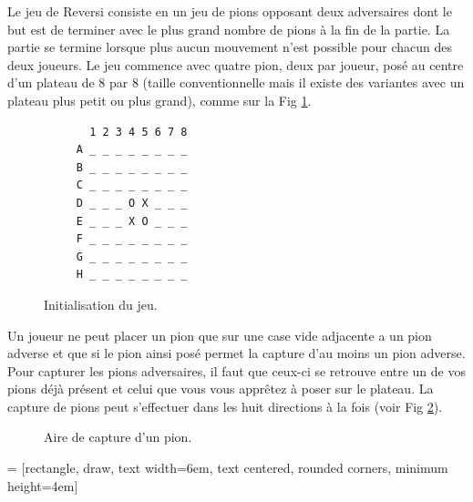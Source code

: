 \documentclass[10pt,a4paper]{article}
\begin{document}
Le jeu de Reversi consiste en un jeu de pions opposant deux adversaires dont le but est de terminer avec le plus grand nombre de pions à la fin de la partie. La partie se termine lorsque plus aucun mouvement n'est possible pour chacun des deux joueurs. Le jeu commence avec quatre pion, deux par joueur, posé au centre d'un plateau de 8 par 8 (taille conventionnelle mais il existe des variantes avec un plateau plus petit ou plus grand), comme sur la Fig \ref{fig:début_du_jeu}.
 \begin{figure}[H]    
    \centering
    \begin{BVerbatim}
       1 2 3 4 5 6 7 8
     A _ _ _ _ _ _ _ _
     B _ _ _ _ _ _ _ _
     C _ _ _ _ _ _ _ _
     D _ _ _ O X _ _ _
     E _ _ _ X O _ _ _
     F _ _ _ _ _ _ _ _
     G _ _ _ _ _ _ _ _
     H _ _ _ _ _ _ _ _
    \end{BVerbatim}
    \caption {Initialisation du jeu.\label{fig:début_du_jeu}}
    \end{figure}
Un joueur ne peut placer un pion que sur une case vide adjacente a un pion adverse et que si le pion ainsi posé permet la capture d'au moins un pion adverse. Pour capturer les pions adversaires, il faut que ceux-ci se retrouve entre un de vos pions déjà présent et celui que vous vous apprêtez à poser sur le plateau. La capture de pions peut s'effectuer dans les huit directions à la fois (voir Fig \ref{fig:aire_de_capture}).
 \begin{figure}[H]    
    \centering
{}
    \caption {Aire de capture d'un pion.\label{fig:aire_de_capture}}
 \end{figure}
  = [rectangle, draw, text width=6em, text centered, rounded corners, minimum height=4em]
 
\end{document}
